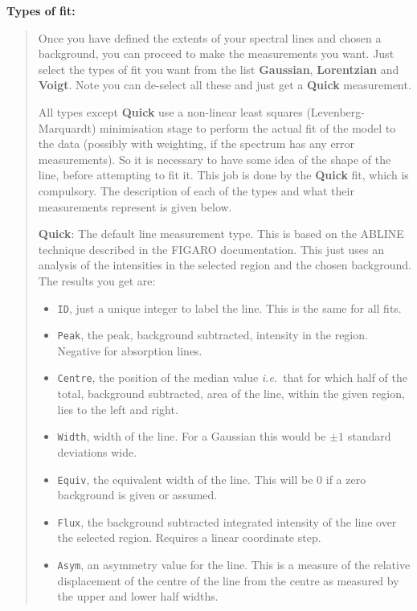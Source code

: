 \documentclass[twoside,11pt]{article}
\newcommand{\xref}[3]{#1}
\renewcommand{\_}{\texttt{\symbol{95}}}
\newcommand{\labelitem}[1]{\textbf{#1}}
\newcommand{\hitext}[1]{\texttt{#1}}
\newcommand{\ie}{\textit{i.e.}}
\newcommand{\subheading}[1]{\textbf{\large{#1}}}
\begin{document}
\subheading{Types of fit:}
\begin{quote}
 Once you have defined the extents of your spectral lines and chosen a
 background, you can proceed to make the measurements you want. Just
 select the types of fit you want from the list \labelitem{Gaussian},
 \labelitem{Lorentzian} and \labelitem{Voigt}. Note you can de-select
 all these and just get a \labelitem{Quick} measurement.

 All types except \labelitem{Quick} use a non-linear least squares
 (Levenberg-Marquardt) minimisation stage to perform the actual fit of
 the model to the data (possibly with weighting, if the spectrum has
 any error measurements). So it is necessary to have some idea of the
 shape of the line, before attempting to fit it. This job is done by
 the \labelitem{Quick} fit, which is compulsory. The description of
 each of the types and what their measurements represent is given
 below.

 \labelitem{Quick}: The default line measurement type. This is based on
 the ABLINE technique described in the \xref{FIGARO}{sun86}{}
 documentation. This just uses an analysis of the intensities in the
 selected region and the chosen background. The results you get are:
 \begin{itemize}
   \item \hitext{ID}, just a unique integer to label the line. This is
         the same for all fits.
   \item \hitext{Peak}, the peak, background subtracted, intensity in
         the region. Negative for absorption lines.
   \item \hitext{Centre}, the position of the median value \ie\ that
         for which half of the total, background subtracted, area of
         the line, within the given region, lies to the left and right.
   \item \hitext{Width}, width of the line. For a Gaussian this would
         be $\pm 1$ standard deviations wide.
   \item \hitext{Equiv}, the equivalent width of the line. This will be
         $0$ if a zero background is given or assumed.
   \item \hitext{Flux}, the background subtracted integrated intensity
         of the line over the selected region. Requires a linear
         coordinate step.
   \item \hitext{Asym}, an asymmetry value for the line. This is a
         measure of the relative displacement of the centre of the
         line from the centre as measured by the upper and lower
         half widths.
 \end{itemize}


\end{quote}
\end{document}
